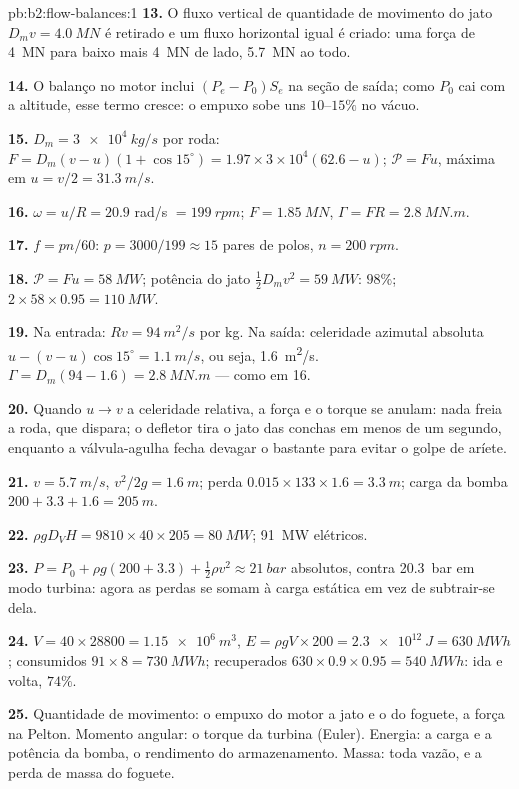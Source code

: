 \begin{solution}{pb:b2:flow-balances:1}
\textbf{13.} O fluxo vertical de quantidade de movimento do jato $D_mv = \qty{4.0}{MN}$ é
retirado e um fluxo horizontal igual é criado: uma força de \qty{4}{MN} para baixo
mais \qty{4}{MN} de lado, \qty{5.7}{MN} ao todo.

\textbf{14.} O balanço no motor inclui $(P_e - P_0)S_e$ na
seção de saída; como $P_0$ cai com a altitude, esse termo cresce: o empuxo
sobe uns $10$--$15\%$ no vácuo.

\textbf{15.} $D_m = \qty{3e4}{kg/s}$ por roda: $F = D_m(v - u)(1 + \cos15^\circ) =
1.97 \times 3 \times 10^4(62.6 - u)$; $\mathcal P = Fu$, máxima em $u = v/2 = \qty{31.3}{m/s}$.

\textbf{16.} $\omega = u/R = 20.9$ rad/s $= \qty{199}{rpm}$; $F = \qty{1.85}{MN}$, $\Gamma = FR
= \qty{2.8}{MN.m}$.

\textbf{17.} $f = pn/60$: $p = 3000/199 \approx 15$ pares de polos, $n = \qty{200}{rpm}$.

\textbf{18.} $\mathcal P = Fu = \qty{58}{MW}$; potência do jato $\tfrac12D_mv^2 = \qty{59}{MW}$:
$98\%$; $2 \times 58 \times 0.95 = \qty{110}{MW}$.

\textbf{19.} Na entrada: $Rv = \qty{94}{m^2/s}$ por kg. Na saída: celeridade azimutal absoluta
$u - (v - u)\cos15^\circ = \qty{1.1}{m/s}$, ou seja, \qty{1.6}{m^2/s}. $\Gamma = D_m(94 -
1.6) = \qty{2.8}{MN.m}$ --- como em 16.

\textbf{20.} Quando $u \to v$ a celeridade relativa, a força e o torque
se anulam: nada freia a roda, que dispara; o defletor
tira o jato das conchas em menos de um segundo, enquanto a válvula-agulha
fecha devagar o bastante para evitar o golpe de aríete.

\textbf{21.} $v = \qty{5.7}{m/s}$, $v^2/2g = \qty{1.6}{m}$; perda $0.015 \times 133 \times 1.6 =
\qty{3.3}{m}$; carga da bomba $200 + 3.3 + 1.6 = \qty{205}{m}$.

\textbf{22.} $\rho gD_VH = 9810 \times 40 \times 205 = \qty{80}{MW}$; \qty{91}{MW} elétricos.

\textbf{23.} $P = P_0 + \rho g(200 + 3.3) + \tfrac12\rho v^2 \approx \qty{21}{bar}$ absolutos,
contra \qty{20.3}{bar} em modo turbina: agora as perdas se somam à
carga estática em vez de subtrair-se dela.

\textbf{24.} $V = 40 \times 28800 = \qty{1.15e6}{m^3}$, $E = \rho gV \times 200 = \qty{2.3e12}{J}
= \qty{630}{MWh}$; consumidos $91 \times 8 = \qty{730}{MWh}$; recuperados $630 \times 0.9 \times
0.95 = \qty{540}{MWh}$: ida e volta, $74\%$.

\textbf{25.} Quantidade de movimento: o empuxo do motor a jato e o do foguete, a
força na Pelton. Momento angular: o torque da turbina (Euler). Energia: a
carga e a potência da bomba, o rendimento do armazenamento. Massa: toda vazão,
e a perda de massa do foguete.
\end{solution}
